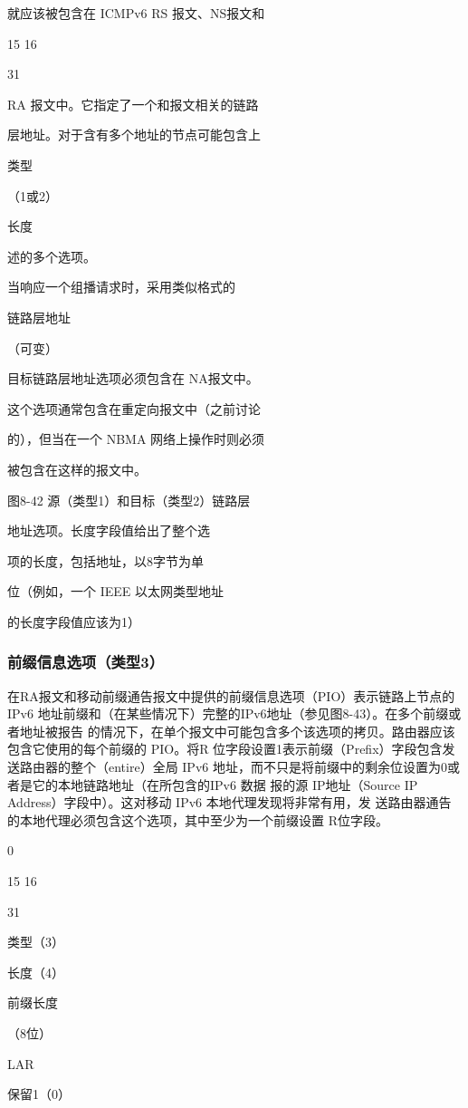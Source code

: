 就应该被包含在 ICMPv6 RS 报文、NS报文和

15 16

31

RA 报文中。它指定了一个和报文相关的链路

层地址。对于含有多个地址的节点可能包含上

类型

（1或2）

长度

述的多个选项。

当响应一个组播请求时，采用类似格式的

链路层地址

（可变）

目标链路层地址选项必须包含在 NA报文中。

这个选项通常包含在重定向报文中（之前讨论

的），但当在一个 NBMA 网络上操作时则必须

被包含在这样的报文中。

图8-42 源（类型1）和目标（类型2）链路层

地址选项。长度字段值给出了整个选

项的长度，包括地址，以8字节为单

位（例如，一个 IEEE 以太网类型地址

的长度字段值应该为1）

\subsubsection{前缀信息选项（类型3）}
在RA报文和移动前缀通告报文中提供的前缀信息选项（PIO）表示链路上节点的IPv6
地址前缀和（在某些情况下）完整的IPv6地址（参见图8-43）。在多个前缀或者地址被报告
的情况下，在单个报文中可能包含多个该选项的拷贝。路由器应该包含它使用的每个前缀的
PIO。将R 位字段设置1表示前缀（Prefix）字段包含发送路由器的整个（entire）全局 IPv6
地址，而不只是将前缀中的剩余位设置为0或者是它的本地链路地址（在所包含的IPv6 数据
报的源 IP地址（Source IP Address）字段中）。这对移动 IPv6 本地代理发现将非常有用，发
送路由器通告的本地代理必须包含这个选项，其中至少为一个前缀设置 R位字段。

0

15 16

31

类型（3）

长度（4）

前缀长度

（8位）

LAR

保留1（0）

